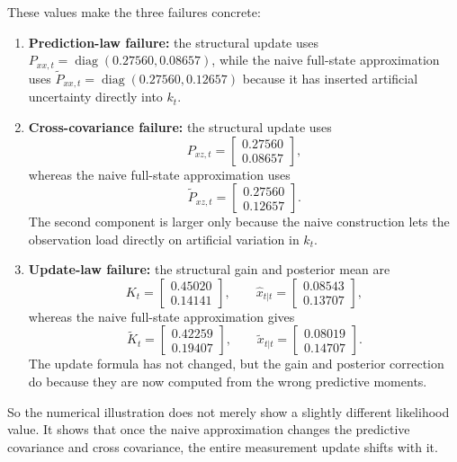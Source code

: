 These values make the three failures concrete:
\begin{enumerate}[label=(\roman*)]
  \item \textbf{Prediction-law failure:}
    the structural update uses
    $P_{xx,t}=\operatorname{diag}(0.27560,0.08657)$,
    while the naive full-state approximation uses
    $\tilde P_{xx,t}=\operatorname{diag}(0.27560,0.12657)$ because it has
    inserted artificial uncertainty directly into $k_t$.
  \item \textbf{Cross-covariance failure:}
    the structural update uses
    \[
      P_{xz,t}=
      \begin{bmatrix}
        0.27560\\ 0.08657
      \end{bmatrix},
    \]
    whereas the naive full-state approximation uses
    \[
      \tilde P_{xz,t}=
      \begin{bmatrix}
        0.27560\\ 0.12657
      \end{bmatrix}.
    \]
    The second component is larger only because the naive construction lets the
    observation load directly on artificial variation in $k_t$.
  \item \textbf{Update-law failure:}
    the structural gain and posterior mean are
    \[
      K_t=
      \begin{bmatrix}
        0.45020\\ 0.14141
      \end{bmatrix},
      \qquad
      \hat x_{t|t}=
      \begin{bmatrix}
        0.08543\\ 0.13707
      \end{bmatrix},
    \]
    whereas the naive full-state approximation gives
    \[
      \tilde K_t=
      \begin{bmatrix}
        0.42259\\ 0.19407
      \end{bmatrix},
      \qquad
      \tilde x_{t|t}=
      \begin{bmatrix}
        0.08019\\ 0.14707
      \end{bmatrix}.
    \]
    The update formula has not changed, but the gain and posterior correction do
    because they are now computed from the wrong predictive moments.
\end{enumerate}
So the numerical illustration does not merely show a slightly different
likelihood value.  It shows that once the naive approximation changes the
predictive covariance and cross covariance, the entire measurement update shifts
with it.

